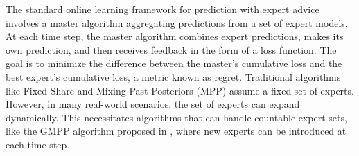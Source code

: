 \documentclass{icorsdssv2024}
\begin{document}
The standard online learning framework for prediction with expert advice involves a master algorithm aggregating predictions from a set of expert models. At each time step, the master algorithm combines expert predictions, makes its own prediction, and then receives feedback in the form of a loss function. The goal is to minimize the difference between the master's cumulative loss and the best expert's cumulative loss, a metric known as regret.
Traditional algorithms like Fixed Share \cite{article98} and Mixing Past Posteriors (MPP) \cite{article02} assume a fixed set of experts. However, in many real-world scenarios, the set of experts can expand dynamically. This necessitates algorithms that can handle countable expert sets, like the GMPP algorithm proposed in \cite{article}, where new experts can be introduced at each time step. 
%
\end{document}
